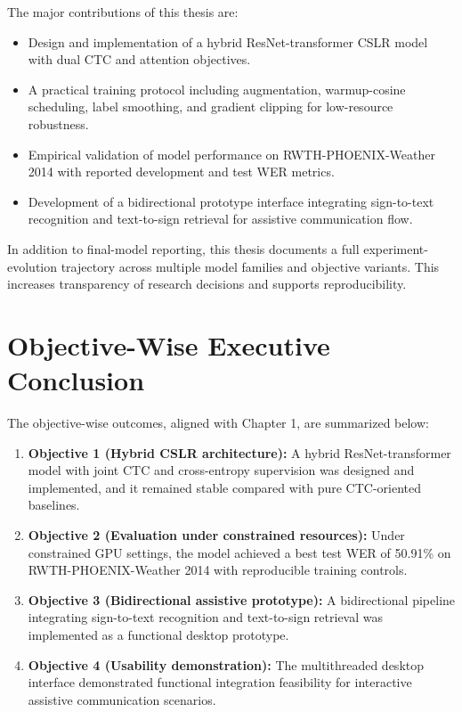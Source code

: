 The major contributions of this thesis are:
\begin{itemize}
    \item Design and implementation of a hybrid ResNet-transformer CSLR model with dual CTC and attention objectives.
    \item A practical training protocol including augmentation, warmup-cosine scheduling, label smoothing, and gradient clipping for low-resource robustness.
    \item Empirical validation of model performance on RWTH-PHOENIX-Weather 2014 with reported development and test WER metrics.
    \item Development of a bidirectional prototype interface integrating sign-to-text recognition and text-to-sign retrieval for assistive communication flow.
\end{itemize}

In addition to final-model reporting, this thesis documents a full experiment-evolution trajectory across multiple model families and objective variants. This increases transparency of research decisions and supports reproducibility.

\section{Objective-Wise Executive Conclusion}

The objective-wise outcomes, aligned with Chapter 1, are summarized below:
\begin{enumerate}
    \item \textbf{Objective 1 (Hybrid CSLR architecture):} A hybrid ResNet-transformer model with joint CTC and cross-entropy supervision was designed and implemented, and it remained stable compared with pure CTC-oriented baselines.
    \item \textbf{Objective 2 (Evaluation under constrained resources):} Under constrained GPU settings, the model achieved a best test WER of 50.91\% on RWTH-PHOENIX-Weather 2014 with reproducible training controls.
    \item \textbf{Objective 3 (Bidirectional assistive prototype):} A bidirectional pipeline integrating sign-to-text recognition and text-to-sign retrieval was implemented as a functional desktop prototype.
    \item \textbf{Objective 4 (Usability demonstration):} The multithreaded desktop interface demonstrated functional integration feasibility for interactive assistive communication scenarios.
\end{enumerate}

